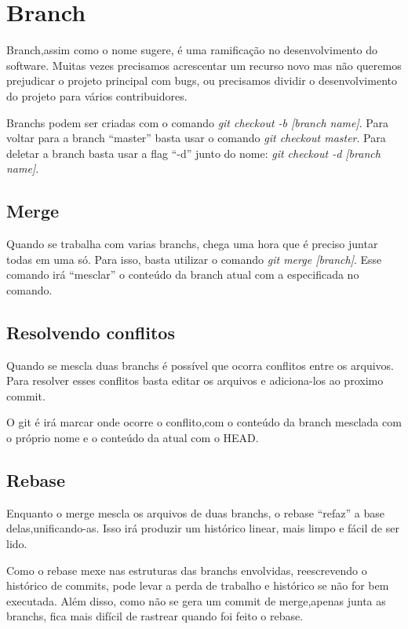 \documentclass[]{article}
\begin{document}
\section{Branch}

Branch,assim como o nome sugere, é uma ramificação no desenvolvimento do software.
Muitas vezes precisamos acrescentar um recurso novo mas não queremos prejudicar o projeto principal com bugs, 
ou precisamos dividir o desenvolvimento do projeto para vários contribuidores.


Branchs podem ser criadas com o comando \textit{git checkout -b [branch name]}.
Para voltar para a branch ``master'' basta usar o comando \textit{git checkout master}.
Para deletar a branch basta usar a flag ``-d'' junto do nome: \textit{git checkout -d [branch name]}.

\subsection*{Merge}

Quando se trabalha com varias branchs, chega uma hora que é preciso juntar todas em uma só.
 Para isso, basta utilizar o comando \textit{git merge [branch]}.
 Esse comando irá ``mesclar'' o conteúdo da branch atual com a especificada no comando.

\subsection*{Resolvendo conflitos}
Quando se mescla duas branchs é possível que ocorra conflitos entre os arquivos.
Para resolver esses conflitos basta editar os arquivos e adiciona-los ao proximo commit.

O git é irá marcar onde ocorre o conflito,com o conteúdo da branch mesclada com o próprio nome e o conteúdo da atual com o HEAD.

\subsection*{Rebase}
Enquanto o merge mescla os arquivos de duas branchs, o rebase ``refaz'' a base delas,unificando-as.
Isso irá produzir um histórico linear, mais limpo e fácil de ser lido. 

Como o rebase mexe nas estruturas das branchs envolvidas, reescrevendo o histórico de commits, pode levar a perda de trabalho e histórico se não for bem executada.
Além disso, como não se gera um commit de merge,apenas junta as branchs, fica mais difícil de rastrear quando foi feito o rebase.
\end{document}
